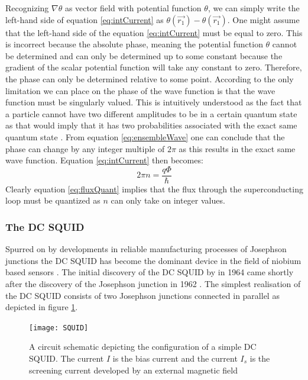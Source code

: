 Recognizing $\nabla\theta$ as vector field with potential function $\theta$, we can simply write the left-hand side of equation \ref{eq:intCurrent} as $\theta(\Vec{r_1}) - \theta(\Vec{r_1})$. One might assume that the left-hand side of the equation \ref{eq:intCurrent} must be equal to zero. This is incorrect because the absolute phase, meaning the potential function $\theta$ cannot be determined and can only be determined up to some constant because the gradient of the scalar potential function will take any constant to zero. Therefore, the phase can only be determined relative to some point. According to \cite{Feynman_Leighton_Sands_2013} the only limitation we can place on the phase of the wave function is that the wave function must be singularly valued. This is intuitively understood as the fact that a particle cannot have two different amplitudes to be in a certain quantum state as that would imply that it has two probabilities associated with the exact same quantum state \cite{Feynman_Leighton_Sands_2013}. From equation \ref{eq:ensembleWave} one can conclude that the phase can change by any integer multiple of $2\pi$ as this results in the exact same wave function. Equation \ref{eq:intCurrent} then becomes:
\begin{equation}
    2\pi n = \frac{q\Phi}{\hbar}
    \label{eq:fluxQuant}
\end{equation}
Clearly equation \ref{eq:fluxQuant} implies that the flux through the superconducting loop must be quantized as $n$ can only take on integer values.

\subsubsection*{The DC SQUID}
Spurred on by developments in reliable manufacturing processes of Josephson junctions the DC SQUID has become the dominant device in the field of niobium based sensors \cite{Drung2016NBSQUIDS}. The initial discovery of the DC SQUID by \cite{DCSQUIDoriginalPaper} in 1964 came shortly after the discovery of the Josephson junction in 1962 \cite{JOSEPHSONJUNCTION}. The simplest realisation of the DC SQUID consists of two Josephson junctions connected in parallel as depicted in figure \ref{fig:squidFig}.

\begin{figure}[h]
    \centering
    \texttt{[image: SQUID]}

    \caption{A circuit schematic depicting the configuration of a simple DC SQUID. The current $I$ is the bias current and the current $I_s$ is the screening current developed by an external magnetic field}
    \label{fig:squidFig}
\end{figure}

